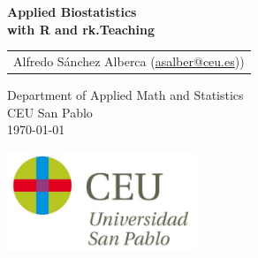 \begin{titlepage}
\thispagestyle{empty}
\vspace*{7cm}
\par

\begin{center}
\normalfont\fontsize{30}{30}\selectfont
{\bfseries \color{blueceu}Applied Biostatistics\\ with R and rk.Teaching}
\end{center}
\vspace{1cm}

\begin{center}
\Large
\begin{tabular}{c}
Alfredo S\'anchez Alberca (\href{mailto:asalber@ceu.es}{asalber@ceu.es}))
\end{tabular}

\medskip 
Department of Applied Math and Statistics\\ CEU San Pablo\\[1cm]
\medskip 
\today

\vspace{1cm}
\includegraphics[height=3cm]{img/logo_uspceu}
\end{center}
\vfill
\end{titlepage}